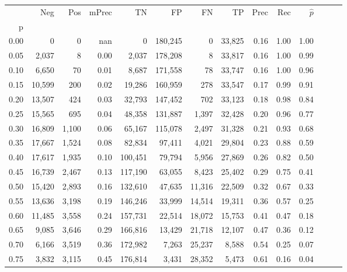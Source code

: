 \begin{tabular}{rrrrrrrrrrrrrr}
\toprule
{} &     Neg &    Pos & mPrec &       TN &       FP &      FN &      TP &  Prec &   Rec & $\hat{p}$ \\
p    &         &        &       &          &          &         &         &       &       &           \\
\midrule
0.00 &       0 &      0 &   nan &        0 &  180,245 &       0 &  33,825 &  0.16 &  1.00 &      1.00 \\
0.05 &   2,037 &      8 &  0.00 &    2,037 &  178,208 &       8 &  33,817 &  0.16 &  1.00 &      0.99 \\
0.10 &   6,650 &     70 &  0.01 &    8,687 &  171,558 &      78 &  33,747 &  0.16 &  1.00 &      0.96 \\
0.15 &  10,599 &    200 &  0.02 &   19,286 &  160,959 &     278 &  33,547 &  0.17 &  0.99 &      0.91 \\
0.20 &  13,507 &    424 &  0.03 &   32,793 &  147,452 &     702 &  33,123 &  0.18 &  0.98 &      0.84 \\
0.25 &  15,565 &    695 &  0.04 &   48,358 &  131,887 &   1,397 &  32,428 &  0.20 &  0.96 &      0.77 \\
0.30 &  16,809 &  1,100 &  0.06 &   65,167 &  115,078 &   2,497 &  31,328 &  0.21 &  0.93 &      0.68 \\
0.35 &  17,667 &  1,524 &  0.08 &   82,834 &   97,411 &   4,021 &  29,804 &  0.23 &  0.88 &      0.59 \\
0.40 &  17,617 &  1,935 &  0.10 &  100,451 &   79,794 &   5,956 &  27,869 &  0.26 &  0.82 &      0.50 \\
0.45 &  16,739 &  2,467 &  0.13 &  117,190 &   63,055 &   8,423 &  25,402 &  0.29 &  0.75 &      0.41 \\
0.50 &  15,420 &  2,893 &  0.16 &  132,610 &   47,635 &  11,316 &  22,509 &  0.32 &  0.67 &      0.33 \\
0.55 &  13,636 &  3,198 &  0.19 &  146,246 &   33,999 &  14,514 &  19,311 &  0.36 &  0.57 &      0.25 \\
0.60 &  11,485 &  3,558 &  0.24 &  157,731 &   22,514 &  18,072 &  15,753 &  0.41 &  0.47 &      0.18 \\
0.65 &   9,085 &  3,646 &  0.29 &  166,816 &   13,429 &  21,718 &  12,107 &  0.47 &  0.36 &      0.12 \\
0.70 &   6,166 &  3,519 &  0.36 &  172,982 &    7,263 &  25,237 &   8,588 &  0.54 &  0.25 &      0.07 \\
0.75 &   3,832 &  3,115 &  0.45 &  176,814 &    3,431 &  28,352 &   5,473 &  0.61 &  0.16 &      0.04 \\

\end{tabular}
